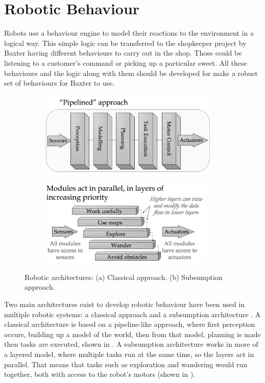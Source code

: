 \section{Robotic Behaviour}
Robots use a behaviour engine to model their reactions to the environment in a logical way. This simple logic can be transferred to the shopkeeper project by Baxter having different behaviours to carry out in the shop. Those could be listening to a customer's command or picking up a particular sweet. All these behaviours and the logic along with them should be developed for make a robust set of behaviours for Baxter to use.
\begin{figure}[H]
    \captionsetup[subfigure]{justification=centering}
    \begin{subfigure}[H]{0.475\textwidth}   
        \centering 
        \caption{}
        \includegraphics[width=\textwidth, height=4.1cm]{classical.png}
        \label{fig:classical}
    \end{subfigure}
    \begin{subfigure}[H]{0.475\textwidth}   
        \centering
        \caption{}
        \includegraphics[width=\textwidth, height=4.1cm]{subsumption.png}
        \label{fig:subsumption}
    \end{subfigure}
    \caption{Robotic architectures: (a) Classical approach. (b) Subsumption approach.}
\end{figure}
Two main architectures exist to develop robotic behaviour have been used in multiple robotic systems: a classical approach and a subsumption architecture \cite{subsumption}. A classical architecture is based on a pipeline-like approach, where first perception occurs, building up a model of the world, then from that model, planning is made then tasks are executed, shown in \textbf{}. A subsumption architecture works in more of a layered model, where multiple tasks run at the same time, so the layers act in parallel. That means that tasks such as exploration and wandering would run together, both with access to the robot's motors (shown in \textbf{}).
